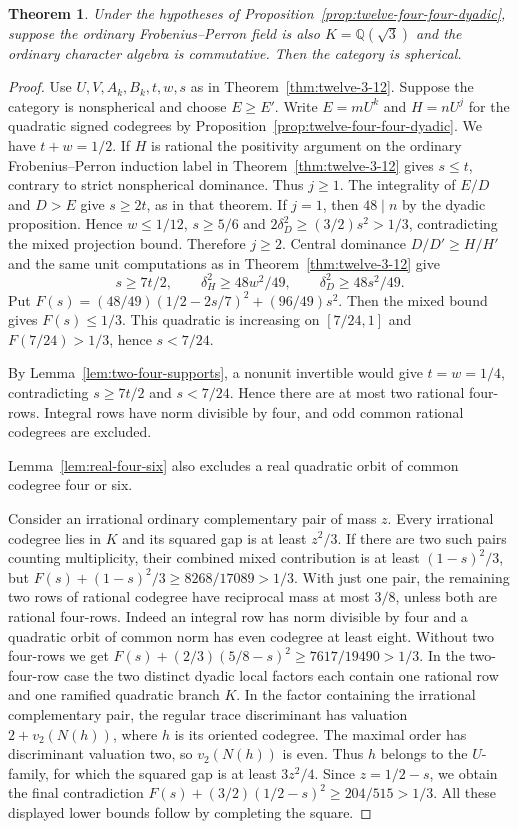 \documentclass[11pt,reqno]{amsart}
\newtheorem{theorem}{Theorem}[section]
\theoremstyle{remark}\newtheorem{remark}[theorem]{Remark}
\numberwithin{equation}{section}
\begin{document}
\begin{theorem}\label{thm:four-four-distinct}
Under the hypotheses of Proposition~\ref{prop:twelve-four-four-dyadic},
suppose the ordinary Frobenius--Perron field is also
$K=\mathbb Q(\sqrt3)$ and the ordinary character algebra is
commutative. Then the category is spherical.
\end{theorem}
\begin{proof}
Use $U,V,A_k,B_k,t,w,s$ as in Theorem~\ref{thm:twelve-3-12}.
Suppose the category is nonspherical and choose $E\ge E'$. Write
$E=mU^k$ and $H=nU^j$ for the quadratic signed codegrees by
Proposition~\ref{prop:twelve-four-four-dyadic}. We have $t+w=1/2$.
If $H$ is rational the positivity argument on the ordinary
Frobenius--Perron induction label in Theorem~\ref{thm:twelve-3-12}
gives $s\le t$, contrary to strict nonspherical dominance. Thus
$j\ge1$. The integrality of $E/D$ and $D>E$ give
$s\ge2t$, as in that theorem. If $j=1$, then $48\mid n$ by the
dyadic proposition. Hence $w\le1/12$, $s\ge5/6$ and
$2\delta_D^2\ge(3/2)s^2>1/3$, contradicting the mixed projection
bound. Therefore $j\ge2$. Central dominance
$D/D'\ge H/H'$ and the same unit computations as in
Theorem~\ref{thm:twelve-3-12} give
\[
 s\ge7t/2,\qquad \delta_H^2\ge48w^2/49,\qquad
 \delta_D^2\ge48s^2/49.
\]
Put $F(s)=(48/49)(1/2-2s/7)^2+(96/49)s^2$. Then the mixed
bound gives $F(s)\le1/3$. This quadratic is increasing on
$[7/24,1]$ and $F(7/24)>1/3$, hence $s<7/24$.

By Lemma~\ref{lem:two-four-supports}, a nonunit invertible would give
$t=w=1/4$, contradicting $s\ge7t/2$ and $s<7/24$. Hence there are
at most two rational four-rows. Integral rows have norm divisible by
four, and odd common rational codegrees are excluded.

Lemma~\ref{lem:real-four-six} also excludes a real quadratic
orbit of common codegree four or six.

Consider an irrational ordinary complementary pair of mass $z$.
Every irrational codegree lies in $K$ and its squared gap is at
least $z^2/3$. If there are two such pairs counting multiplicity,
their combined mixed contribution is at least $(1-s)^2/3$, but
$F(s)+(1-s)^2/3\ge8268/17089>1/3$. With just one pair, the
remaining two rows of rational codegree have reciprocal mass at most
$3/8$, unless both are rational four-rows. Indeed an integral row
has norm divisible by four and a quadratic orbit of common norm
has even codegree at least eight. Without two four-rows we get
$F(s)+(2/3)(5/8-s)^2\ge7617/19490>1/3$. In the two-four-row case
the two distinct dyadic local factors each contain one rational
row and one ramified quadratic branch $K$. In the factor containing
the irrational complementary pair, the regular trace discriminant
has valuation $2+v_2(N(h))$, where $h$ is its oriented codegree.
The maximal order has discriminant valuation two, so $v_2(N(h))$
is even. Thus $h$ belongs to the $U$-family, for which the squared
gap is at least $3z^2/4$. Since $z=1/2-s$, we obtain the final
contradiction $F(s)+(3/2)(1/2-s)^2\ge204/515>1/3$.
All these displayed lower bounds follow by completing the square.


\end{proof}
\end{document}
